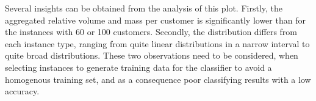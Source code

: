 Several insights can be obtained from the analysis of this plot. Firstly, the aggregated relative
volume and mass per customer is significantly lower than for the instances with 60 or 100 customers. Secondly,
the distribution differs from each instance type, ranging from quite linear distributions in a narrow
interval to quite broad distributions.  These two observations need to be considered, when selecting
instances to generate training data for the classifier to avoid a homogenous training set, and
as a consequence poor classifying results with a low accuracy.





